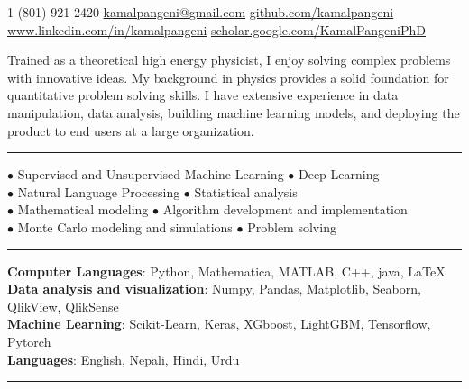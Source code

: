 \documentclass[10pt,letterpaper]{article}
\begin{document}

\noindent\textsmaller{+}1 (801) 921-2420\bull
\href{mailto:kamalpangeni@gmail.com}{kamalpangeni@gmail.com}\bull
\href{https://github.com/kamalpangeni}
{github.com/kamalpangeni}\\
\href{https://www.linkedin.com/in/kamal-pangeni-31242a29/}
{www.linkedin.com/in/kamalpangeni}\bull
\href{https://scholar.google.com/citations?user=MJPS73gAAAAJ&hl=en}
{scholar.google.com/\textsmaller{+}KamalPangeniPhD}

\spacedhrule{0.9em}{-0.4em}

Trained as a theoretical high energy physicist, I enjoy solving complex problems with innovative ideas. My background in physics provides a solid foundation for quantitative problem solving skills. I have extensive experience in data manipulation, data analysis, building machine learning models, and deploying the product to end users at a large organization.\\
\hrule
 $\bullet$ Supervised and Unsupervised Machine Learning \hspace{2.6cm}
 $\bullet$ Deep Learning\\
 $\bullet$ Natural Language Processing\hspace{5.4cm}
 $\bullet$ Statistical analysis\\
 $\bullet$ Mathematical modeling \hspace{6.1cm}
 $\bullet$ Algorithm development and implementation\\
 $\bullet$ Monte Carlo modeling and simulations \hspace{3.95cm}
 $\bullet$ Problem solving
 
\hrule
{}
\textbf{Computer Languages}: Python, Mathematica, MATLAB, C++, java, \LaTeX \\
\textbf{Data analysis and visualization}: Numpy, Pandas, Matplotlib, Seaborn, QlikView, QlikSense\\
\textbf{ Machine Learning}: Scikit-Learn, Keras, XGboost, LightGBM, Tensorflow, Pytorch\\
\textbf{Languages}: English, Nepali, Hindi, Urdu\\
\hrule

\end{document}
